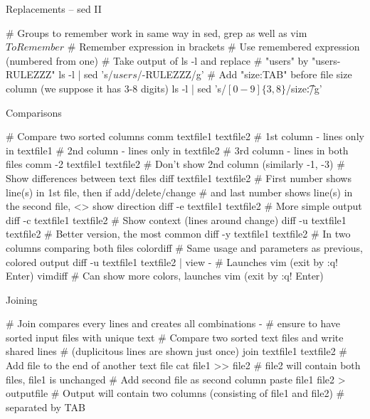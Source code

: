 \documentclass[compress, ucs, xelatex, 11pt, xcolor=svgnames,
  hyperref={
    bookmarks=true,
    unicode=true,
    colorlinks=true,
    pdftitle={Linux, command line and MetaCentrum},
    plainpages=false,
    pdfauthor={Vojtech Zeisek},
    pdfsubject={Course about use of Linux command line, writing shell scripts and using MetaCentrum of CESNET},
    pdfcreator={XeLaTeX},
    pdfkeywords={Linux, GNU, BASH, shell, command line, MetaCentrum},
    linkcolor=Red,
    anchorcolor=Blue,
    citecolor=Purple,
    filecolor=DodgerBlue,
    menucolor=DarkOrchid,
    urlcolor=DeepSkyBlue,
    pdftex},
  url={hyphens, lowtilde} %
  ]{beamer}
\begin{document}
\begin{frame}[fragile]{Replacements -- sed II}
  \begin{bashcode}
    # Groups to remember work in same way in sed, grep as well as vim
    \(ToRemember\) # Remember expression in brackets
    \Number # Use remembered expression (numbered from one)
    # Take output of ls -l and replace # "users" by "users-RULEZZZ"
    ls -l | sed 's/\(users\)/\1-RULEZZZ/g'
    # Add "size:TAB" before file size column (we suppose it has 3-8 digits)
    ls -l | sed 's/\([0-9]\{3,8\}\)/size:\t\1/g'
  \end{bashcode}
\end{frame}

\begin{frame}[fragile]{Comparisons}
  \begin{bashcode}
    # Compare two sorted columns
    comm textfile1 textfile2
      # 1st column - lines only in textfile1
      # 2nd column - lines only in textfile2
      # 3rd column - lines in both files
    comm -2 textfile1 textfile2 # Don't show 2nd column (similarly -1, -3)
    # Show differences between text files
    diff textfile1 textfile2
      # First number shows line(s) in 1st file, then if add/delete/change
      # and last number shows line(s) in the second file, <> show direction
    diff -e textfile1 textfile2 # More simple output
    diff -c textfile1 textfile2 # Show context (lines around change)
    diff -u textfile1 textfile2 # Better version, the most common
    diff -y textfile1 textfile2 # In two columns comparing both files
    colordiff # Same usage and parameters as previous, colored output
    diff -u textfile1 textfile2 | view - # Launches vim (exit by :q! Enter)
    vimdiff # Can show more colors, launches vim (exit by :q! Enter)
  \end{bashcode}
\end{frame}

\begin{frame}[fragile]{Joining}
  \begin{bashcode}
    # Join compares every lines and creates all combinations -
    # ensure to have sorted input files with unique text
    # Compare two sorted text files and write shared lines
    # (duplicitous lines are shown just once)
    join textfile1 textfile2
    # Add file to the end of another text file
    cat file1 >> file2 # file2 will contain both files, file1 is unchanged
    # Add second file as second column
    paste file1 file2 > outputfile
    # Output will contain two columns (consisting of file1 and file2)
    # separated by TAB
  \end{bashcode}
\end{frame}
\end{document}
